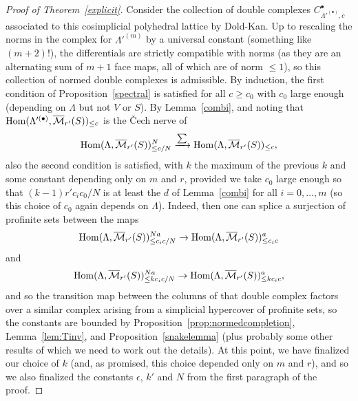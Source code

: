 \begin{proof}[Proof of Theorem~\ref{explicit}]
Consider the collection of double complexes $C_{\Lambda'^{(\bullet)},c}^\bullet$ associated to this cosimplicial polyhedral lattice by Dold-Kan. Up to rescaling the norms in the complex for $\Lambda'^{(m)}$ by a universal constant (something like $(m+2)!$), the differentials are strictly compatible with norms (as they are an alternating sum of $m+1$ face maps, all of which are of norm $\leq 1$), so this collection of normed double complexes is admissible. By induction, the first condition of Proposition~\ref{spectral} is satisfied for all $c\geq c_0$ with $c_0$ large enough (depending on $\Lambda$ but not $V$ or $S$). By Lemma~\ref{combi}, and noting that $\operatorname{Hom}(\Lambda'^{(\bullet)},\overline{\mathcal M}_{r'}(S))_{\leq c}$ is the \v{C}ech nerve of
\[
\operatorname{Hom}(\Lambda,\overline{\mathcal M}_{r'}(S))_{\leq c/N}^N\xrightarrow{\sum} \operatorname{Hom}(\Lambda,\overline{\mathcal M}_{r'}(S))_{\leq c},
\]
also the second condition is satisfied, with $k$ the maximum of the previous $k$ and some constant depending only on $m$ and $r$, provided we take $c_0$ large enough so that $(k-1)r'c_ic_0/N$ is at least the $d$ of Lemma~\ref{combi} for all $i=0,\ldots,m$ (so this choice of $c_0$ again depends on $\Lambda$). Indeed, then one can splice a surjection of profinite sets between the maps
\[
\operatorname{Hom}(\Lambda,\overline{\mathcal M}_{r'}(S))_{\leq c_ic/N}^{Na}\to\operatorname{Hom}(\Lambda,\overline{\mathcal M}_{r'}(S))_{\leq c_ic}^a
\]
and
\[
\operatorname{Hom}(\Lambda,\overline{\mathcal M}_{r'}(S))_{\leq kc_ic/N}^{Na}\to \operatorname{Hom}(\Lambda,\overline{\mathcal M}_{r'}(S))_{\leq kc_ic}^a,
\]
and so the transition map between the columns of that double complex factors over a similar complex arising from a simplicial hypercover of profinite sets, so the constants are bounded by Proposition~\ref{prop:normedcompletion},
	Lemma~\ref{lem:Tinv},
	and Proposition~\ref{snakelemma}
	(plus probably some other results of which we need to work out the details).
	At this point, we have finalized our choice of $k$ (and, as promised, this choice depended only on $m$ and $r$), and so we also finalized the constants $\epsilon$, $k'$ and $N$ from the first paragraph of the proof.


\end{proof}
